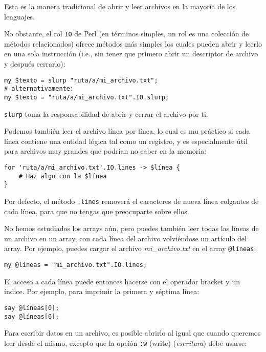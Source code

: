 Esta es la manera tradicional de abrir y leer archivos en la mayoría de
los lenguajes.

No obstante, el rol {\tt IO} de Perl (en términos simples, un rol 
es una colección de métodos relacionados) ofrece métodos más simples
los cuales pueden abrir y leerlo en una sola instrucción (i.e., 
sin tener que primero abrir un descriptor de archivo y después cerrarlo):

\begin{verbatim}
my $texto = slurp "ruta/a/mi_archivo.txt";
# alternativamente:
my $texto = "ruta/a/mi_archivo.txt".IO.slurp;
\end{verbatim}
%

{\tt slurp} toma la responsabilidad de abrir y cerrar el
archivo por ti.

Podemos también leer el archivo línea por línea, lo cual es 
mu práctico si cada línea contiene una entidad lógica tal como
un registro, y es especialmente útil para archivos muy grandes
que podrían no caber en la memoria:

\begin{verbatim}
for 'ruta/a/mi_archivo.txt'.IO.lines -> $línea {
    # Haz algo con la $línea
}
\end{verbatim}
%
Por defecto, el método {\tt .lines} removerá el caracteres de nueva línea
colgantes de cada línea, para que no tengas que preocuparte sobre ellos.
%

No hemos estudiados los arrays aún, pero puedes también leer
todas las líneas de un archivo en un array, con cada línea del
archivo volviéndose un artículo del array. Por ejemplo, puedes
cargar el archivo {\em mi\_archivo.txt} en el array \verb|@líneas|:

\begin{verbatim}
my @líneas = "mi_archivo.txt".IO.lines;
\end{verbatim}
%

El acceso a cada línea puede entonces hacerse con el operador bracket
y un índice. Por ejemplo, para imprimir la primera y séptima línea:

\begin{verbatim}
say @líneas[0];
say @líneas[6];
\end{verbatim}
%
Para escribir datos en un archivo, es posible abrirlo al igual 
que cuando queremos leer desde el mismo, excepto que la opción
{\tt :w} (write) (\emph{escritura}) debe usarse:

